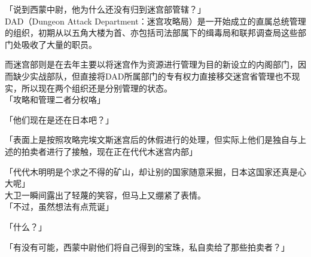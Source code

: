 「说到西蒙中尉，他为什么还没有归到迷宫部管辖？」\\

DAD（Dungeon Attack Department：迷宫攻略局）是一开始成立的直属总统管理的组织，初期从以五角大楼为首、亦包括司法部属下的缉毒局和联邦调查局这些部门处吸收了大量的职员。

而迷宫部则是在去年主要以将迷宫作为资源进行管理为目的新设立的内阁部门，因而缺少实战部队，但直接将DAD所属部门的专有权力直接移交迷宫省管理也不现实，所以现在两个组织还是分别管理的状态。\\

「攻略和管理二者分权咯」

「他们现在是还在日本吧？」

「表面上是按照攻略完埃文斯迷宫后的休假进行的处理，但实际上他们是独自与上述的拍卖者进行了接触，现在正在代代木迷宫内部」

「代代木明明是个求之不得的矿山，却让别的国家随意采掘，日本这国家还真是心大呢」\\

大卫一瞬间露出了轻蔑的笑容，但马上又绷紧了表情。\\

「不过，虽然想法有点荒诞」

「什么？」

「有没有可能，西蒙中尉他们将自己得到的宝珠，私自卖给了那些拍卖者？」\\

